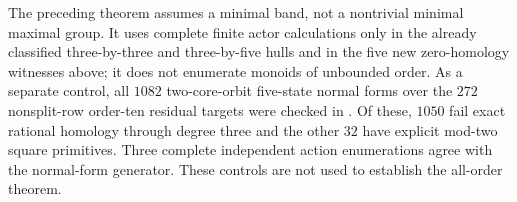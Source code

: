 \begin{remark}
\label{C:five-state-band-cones-scope}
The preceding theorem assumes a minimal band, not a nontrivial
minimal maximal group.  It uses complete finite actor calculations
only in the already classified three-by-three and three-by-five
hulls and in the five new zero-homology witnesses above; it does
not enumerate monoids of unbounded order.
As a separate control, all $1082$ two-core-orbit five-state normal
forms over the $272$ nonsplit-row order-ten residual targets
were checked in .
Of these, $1050$ fail exact rational homology through degree
three and the other $32$ have explicit mod-two square primitives.
Three complete independent action enumerations agree with the
normal-form generator.  These controls are not used to establish
the all-order theorem.
\end{remark}
